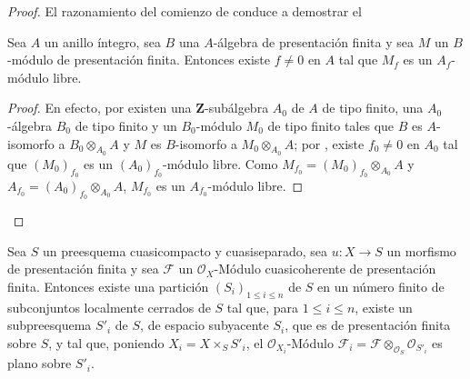 \begin{proof}
El razonamiento del comienzo de  conduce a demostrar el

\begin{lemma}[8.9.4.1]
\label{IV.8.9.4.1-fr}
Sea $A$ un anillo íntegro, sea $B$ una $A$-álgebra de presentación finita y sea $M$ un $B$-módulo de presentación finita.
Entonces existe $f\neq0$ en $A$ tal que $M_f$ es un $A_f$-módulo libre.
\end{lemma}

\begin{proof}
En efecto, por  existen una $\mathbf Z$-subálgebra $A_0$ de $A$ de tipo finito, una $A_0$-álgebra $B_0$ de tipo finito y un $B_0$-módulo $M_0$ de tipo finito tales que $B$ es $A$-isomorfo a $B_0\otimes_{A_0}A$ y $M$ es $B$-isomorfo a $M_0\otimes_{A_0}A$; por , existe $f_0\neq0$ en $A_0$ tal que $(M_0)_{f_0}$ es un $(A_0)_{f_0}$-módulo libre.
Como $M_{f_0}=(M_0)_{f_0}\otimes_{A_0}A$ y $A_{f_0}=(A_0)_{f_0}\otimes_{A_0}A$, $M_{f_0}$ es un $A_{f_0}$-módulo libre.
\end{proof}
\end{proof}

\begin{corollary}[8.9.5]
\label{IV.8.9.5-fr}
Sea $S$ un preesquema cuasicompacto y cuasiseparado, sea $u:X\to S$ un morfismo de presentación finita y sea $\mathcal F$ un $\mathcal O_X$-Módulo cuasicoherente de presentación finita.
Entonces existe una partición $(S_i)_{1\leq i\leq n}$ de $S$ en un número finito de subconjuntos localmente cerrados de $S$ tal que, para $1\leq i\leq n$, existe un subpreesquema $S'_i$ de $S$, de espacio subyacente $S_i$, que es de presentación finita sobre $S$, y tal que, poniendo $X_i=X\times_SS'_i$, el $\mathcal O_{X_i}$-Módulo $\mathcal F_i=\mathcal F\otimes_{\mathcal O_S}\mathcal O_{S'_i}$ es plano sobre $S'_i$.
\end{corollary}

